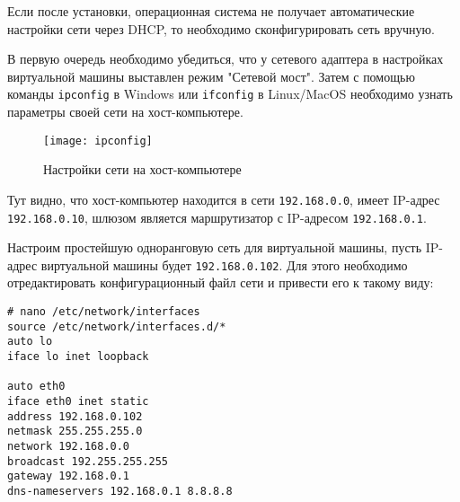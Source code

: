 \begin{figure}[ht]
    \centering
\end{figure}

\begin{figure}[ht]
    \centering
\end{figure}

\begin{figure}[ht]
    \centering
\end{figure}

\begin{figure}[ht]
    \centering
\end{figure}

\clearpage

Если после установки, операционная система не получает автоматические настройки сети через DHCP, то необходимо сконфигурировать сеть вручную.

В первую очередь необходимо убедиться, что у сетевого адаптера в настройках виртуальной машины выставлен режим "Сетевой мост".
Затем с помощью команды \texttt{ipconfig} в Windows или \texttt{ifconfig} в Linux/MacOS необходимо узнать параметры своей сети на хост-компьютере.
\begin{figure}[ht]
    \centering
    \texttt{[image: ipconfig]}
    \caption{Настройки сети на хост-компьютере}\label{pic:ipconfig}
\end{figure}

Тут видно, что хост-компьютер находится в сети \texttt{192.168.0.0}, имеет IP-адрес \texttt{192.168.0.10}, шлюзом является маршрутизатор с IP-адресом \texttt{192.168.0.1}.

Настроим простейшую одноранговую сеть для виртуальной машины, пусть IP-адрес виртуальной машины будет \texttt{192.168.0.102}.
Для этого необходимо отредактировать конфигурационный файл сети и привести его к такому виду:
\begin{lstlisting}
# nano /etc/network/interfaces
source /etc/network/interfaces.d/*
auto lo
iface lo inet loopback

auto eth0
iface eth0 inet static
address 192.168.0.102
netmask 255.255.255.0
network 192.168.0.0
broadcast 192.255.255.255
gateway 192.168.0.1
dns-nameservers 192.168.0.1 8.8.8.8
\end{lstlisting}


